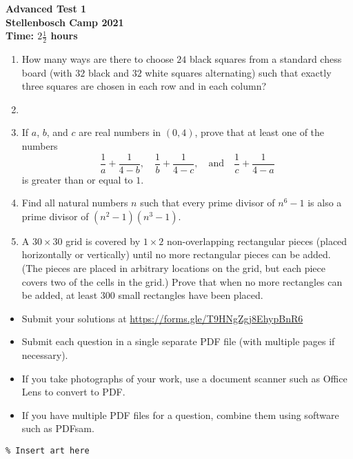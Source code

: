 \documentclass{article}
\begin{document}
\thispagestyle{empty}

\begin{center}
  \textbf{\Large Advanced Test 1}
  \\ \vspace{1em}
  \textbf{\large Stellenbosch Camp 2021}
  \\ \vspace{1em}
  \textbf{\large Time: $2\frac{1}{2}$ hours}
\end{center}

\vspace{24pt}

\begin{enumerate}[1.]

\item %
How many ways are there to choose $24$ black squares from a standard chess board (with $32$ black and $32$ white squares alternating) such that exactly three squares are chosen in each row and in each column?


\item %


\item %
If $a$, $b$, and $c$ are real numbers in $(0,4)$, prove that at least one of the numbers
\[ \frac{1}{a} +\frac{1}{4-b}, \quad \frac{1}{b} +\frac{1}{4-c}, \quad\text{and}\quad \frac{1}{c} +\frac{1}{4-a} \]
is greater than or equal to $1$.


\item %
Find all natural numbers $n$ such that every prime divisor of $n^6 - 1$ is also a prime divisor of $(n^2 - 1)(n^3 - 1)$. 


\item %
A $30 \times 30$ grid is covered by $1 \times 2$ non-overlapping rectangular pieces (placed horizontally or vertically) until no more rectangular pieces can be added. (The pieces are placed in arbitrary locations on the grid, but each piece covers two of the cells in the grid.) Prove that when no more rectangles can be added, at least $300$ small rectangles have been placed.

\end{enumerate}


\vfill
\begin{itemize}
	\item Submit your solutions at \href{https://forms.gle/T9HNgZgj8EhypBnR6}{https://forms.gle/T9HNgZgj8EhypBnR6}
	\item Submit each question in a single separate PDF file (with multiple pages if necessary).
	\item If you take photographs of your work, use a document scanner such as Office Lens to convert to PDF.
	\item If you have multiple PDF files for a question, combine them using software such as PDFsam.
\end{itemize}

\vfill
\centering
\begin{BVerbatim}
\end{BVerbatim}
\end{document}
